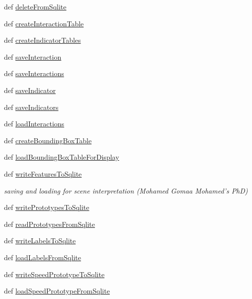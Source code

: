 \begin{DoxyCompactItemize}
def \hyperlink{namespacestorage_ae927c551916029fe71b835d33fb3112b}{delete\-From\-Sqlite}
\item 
def \hyperlink{namespacestorage_abdfdf622b5b34094a49a23049aaa400b}{create\-Interaction\-Table}
\item 
def \hyperlink{namespacestorage_ab627213e501564c7a1061f03e079f28d}{create\-Indicator\-Tables}
\item 
def \hyperlink{namespacestorage_ada38463660fd01b5616fdf115df7907d}{save\-Interaction}
\item 
def \hyperlink{namespacestorage_aa6555b1d8a7d3298644128eb14846806}{save\-Interactions}
\item 
def \hyperlink{namespacestorage_af4283c59c08d34d100da73b9b07ab820}{save\-Indicator}
\item 
def \hyperlink{namespacestorage_a74286a54ccd65fa56a2d2ff8ae08e859}{save\-Indicators}
\item 
def \hyperlink{namespacestorage_a7d16b065425631c6fc090085ef5eaaa7}{load\-Interactions}
\item 
def \hyperlink{namespacestorage_adf3279f20ff1e1f9aabe25c814cefb20}{create\-Bounding\-Box\-Table}
\item 
def \hyperlink{namespacestorage_a651d604c13f73a8d00f8848f2b376d90}{load\-Bounding\-Box\-Table\-For\-Display}
\item 
def \hyperlink{namespacestorage_a87e04c9e63b2d58f09a2b8dc7231ebc4}{write\-Features\-To\-Sqlite}
\begin{DoxyCompactList}\small\item\em saving and loading for scene interpretation (Mohamed Gomaa Mohamed's Ph\-D) \end{DoxyCompactList}\item 
def \hyperlink{namespacestorage_ad8be5b737852818fa1052f17db617c46}{write\-Prototypes\-To\-Sqlite}
\item 
def \hyperlink{namespacestorage_a9bc889e6b1567e3d16801b85947396de}{read\-Prototypes\-From\-Sqlite}
\item 
def \hyperlink{namespacestorage_a26f4940055f802bf932573f68b0fdb00}{write\-Labels\-To\-Sqlite}
\item 
def \hyperlink{namespacestorage_a427184c2e4933c01c8ac9a58515c93d4}{load\-Labels\-From\-Sqlite}
\item 
def \hyperlink{namespacestorage_a5b935fc78f3b1497e423abd612b5b634}{write\-Speed\-Prototype\-To\-Sqlite}
\item 
def \hyperlink{namespacestorage_a9dae8282fca581911460a6899a0090f7}{load\-Speed\-Prototype\-From\-Sqlite}

\end{DoxyCompactItemize}
